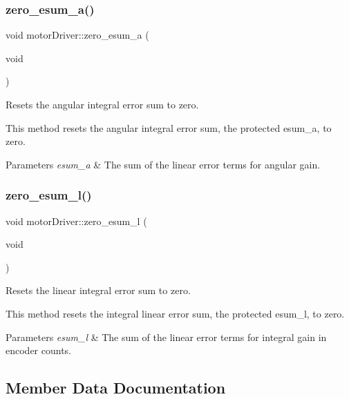 \mbox{\label{classmotorDriver_ae5ac04723b2ceac14fe4c12f9f163cd0}} 
\subsubsection{\texorpdfstring{zero\_esum\_a()}{zero\_esum\_a()}}
{\footnotesize\ttfamily void motor\+Driver\+::zero\+\_\+esum\+\_\+a (\begin{DoxyParamCaption}\item[{void}]{ }\end{DoxyParamCaption})}



Resets the angular integral error sum to zero. 

This method resets the angular integral error sum, the protected esum\+\_\+a, to zero. 
\begin{DoxyParams}{Parameters}
{\em esum\+\_\+a} & The sum of the linear error terms for angular gain. \\
\hline
\end{DoxyParams}
\mbox{\label{classmotorDriver_a32a97045e477c63f1f67d5e398b7e8fd}} 
\subsubsection{\texorpdfstring{zero\_esum\_l()}{zero\_esum\_l()}}
{\footnotesize\ttfamily void motor\+Driver\+::zero\+\_\+esum\+\_\+l (\begin{DoxyParamCaption}\item[{void}]{ }\end{DoxyParamCaption})}



Resets the linear integral error sum to zero. 

This method resets the integral linear error sum, the protected esum\+\_\+l, to zero. 
\begin{DoxyParams}{Parameters}
{\em esum\+\_\+l} & The sum of the linear error terms for integral gain in encoder counts. \\
\hline
\end{DoxyParams}


\subsection{Member Data Documentation}
\mbox{\label{classmotorDriver_adac3e08603f6946acf32d764eddc0105}} 

